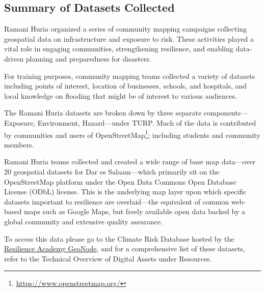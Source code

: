 \documentclass[a4paper,12pt,twoside]{article}
\begin{document}
\subsection{Summary of Datasets Collected}
\begin{multicols}{2}

Ramani Huria organized a series of community mapping campaigns collecting geospatial data on infrastructure and exposure to risk. These activities played a vital role in engaging communities, strengthening resilience, and enabling data-driven planning and preparedness for disasters. 

For training purposes, community mapping teams collected a variety of datasets including points of interest, location of businesses, schools, and hospitals,  and local knowledge on flooding that might be of interest to various audiences.

The Ramani Huria datasets are broken down by three separate components—Exposure, Environment, Hazard—under TURP. Much of the data is contributed by communities and users of OpenStreetMap\footnote{\url{https://www.openstreetmap.org/}}; including students and community members. 

Ramani Huria teams collected and created a wide range of base map data—over 20 geospatial datasets for Dar es Salaam—which primarily sit on the OpenStreetMap platform under the Open Data Commons Open Database License (ODbL) license. This is the underlying map layer upon which specific datasets important to resilience are overlaid—the equivalent of common web-based maps such as Google Maps, but freely available open data backed by a global community and extensive quality assurance.

\begin{mdframed}[hidealllines=true,backgroundcolor=RHgreen!10,innerleftmargin=6pt,innerrightmargin=6pt,leftmargin=-3pt,rightmargin=-3pt]
To access this data please go to the Climate Risk Database hosted by the \href{https://geonode.resilienceacademy.ac.tz/}{Resilience Academy GeoNode}, and for a comprehensive list of these datasets, refer to the Technical Overview of Digital Assets under Resources.
\end{mdframed}
\end{multicols}
\end{document}
